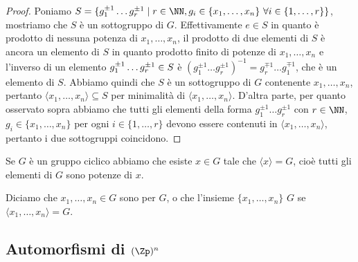 \documentclass[11pt]{scrartcl}
\begin{document}
\begin{proof}
Poniamo $S = \{g_1^{\pm 1} \ldots g_r^{\pm 1}\mid r \in \NN, g_i \in \{x_1, \ldots, x_n\}
~\forall i \in \{1, \ldots, r\}\}$, mostriamo che $S$ è un sottogruppo di $G$. 
Effettivamente $e \in S$ in quanto è prodotto di nessuna potenza di $x_1, \ldots, x_n$, 
il prodotto di due elementi di $S$ è ancora un elemento di $S$ in quanto
prodotto finito di potenze di $x_1, \ldots, x_n$ e l'inverso di un elemento
$g_1^{\pm 1}\ldots g_r^{\pm 1} \in\nolinebreak S$ è $(g_1^{\pm 1}\ldots 
g_r^{\pm 1})^{-1} = g_r^{\mp 1}\ldots g_1^{\mp 1}$, che è un elemento di $S$.
Abbiamo quindi che $S$ è un sottogruppo di $G$ contenente $x_1, \ldots, x_n$,
pertanto $\langle x_1, \ldots, x_n\rangle\subseteq S$ per minimalità di $\langle x_1,
\ldots, x_n\rangle$. D'altra parte, per quanto osservato sopra abbiamo che
tutti gli elementi della forma $g_1^{\pm 1}\ldots g_r^{\pm 1}$ con $r \in \NN$, 
$g_i \in \{x_1, \ldots, x_n\}$ per ogni $i \in \{1, \ldots, r\}$ devono essere
contenuti in $\langle x_1, \ldots, x_n\rangle$, pertanto i due sottogruppi
coincidono.
\end{proof}

\begin{remark}
    Se $G$ è un gruppo ciclico abbiamo che esiste $x \in G$ tale che 
    $\langle x\rangle = G$, cioè tutti gli elementi di $G$ sono potenze di $x$.
\end{remark}

Diciamo che $x_1, \ldots, x_n \in G$ sono  per $G$, o che 
l'insieme $\{x_1, \ldots, x_n\}$  $G$ se $\langle x_1, \ldots, x_n\rangle = G$.

\newpage

\subsection{Automorfismi di $(\Zp)^n$}
\label{sez1.2}
\end{document}
